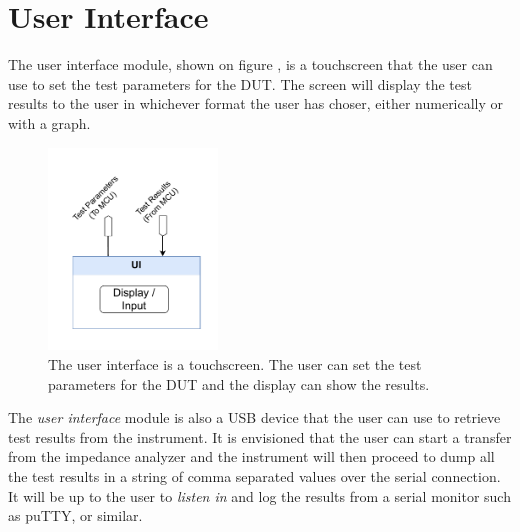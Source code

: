 \section{User Interface} \label{sec:UserInterface}
The user interface module, shown on figure , is a touchscreen that the user can use to set the test parameters for the DUT. The screen will display the test results to the user in whichever format the user has choser, either numerically or with a graph.

\begin{figure}[H]
    \centering
    \includegraphics[clip, trim=18 0 18 0,width=0.40\textwidth]{Sections/6_SystemArchitecture/Figures/UI.pdf}
    \caption{The user interface is a touchscreen. The user can set the test parameters for the DUT and the display can show the results.}
    \label{fig_6_5_UserInterface}
\end{figure}

The \textit{user interface} module is also a USB device that the user can use to retrieve test results from the instrument. It is envisioned that the user can start a transfer from the impedance analyzer and the instrument will then proceed to dump all the test results in a string of comma separated values over the serial connection. It will be up to the user to \textit{listen in} and log the results from a serial monitor such as puTTY, or similar.
